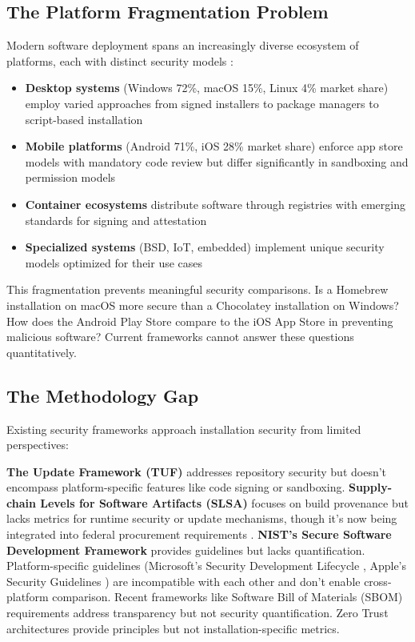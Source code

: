 \documentclass[11pt,a4paper]{article}
\begin{document}
\subsection{The Platform Fragmentation Problem}

Modern software deployment spans an increasingly diverse ecosystem of platforms, each with distinct security models \cite{anderson2024linux,liu2024ios,chen2023android}:

\begin{itemize}
    \item \textbf{Desktop systems} (Windows 72\%, macOS 15\%, Linux 4\% market share) employ varied approaches from signed installers to package managers to script-based installation \cite{microsoft2024windows,apple2023security}
    \item \textbf{Mobile platforms} (Android 71\%, iOS 28\% market share) enforce app store models with mandatory code review but differ significantly in sandboxing and permission models \cite{google2024android}
    \item \textbf{Container ecosystems} distribute software through registries with emerging standards for signing and attestation \cite{kubernetes2024security,docker2024supply}
    \item \textbf{Specialized systems} (BSD, IoT, embedded) implement unique security models optimized for their use cases \cite{kumar2024iot,sadeghi2024embedded}
\end{itemize}

This fragmentation prevents meaningful security comparisons. Is a Homebrew installation on macOS more secure than a Chocolatey installation on Windows? How does the Android Play Store compare to the iOS App Store in preventing malicious software? Current frameworks cannot answer these questions quantitatively.

\subsection{The Methodology Gap}

Existing security frameworks approach installation security from limited perspectives:

\textbf{The Update Framework (TUF)} \cite{kuppusamy2016tuf} addresses repository security but doesn't encompass platform-specific features like code signing or sandboxing. \textbf{Supply-chain Levels for Software Artifacts (SLSA)} \cite{google2021slsa} focuses on build provenance but lacks metrics for runtime security or update mechanisms, though it's now being integrated into federal procurement requirements \cite{cisa2024sbom}. \textbf{NIST's Secure Software Development Framework} \cite{nist2024ssdf} provides guidelines but lacks quantification. Platform-specific guidelines (Microsoft's Security Development Lifecycle \cite{microsoft2024windows}, Apple's Security Guidelines \cite{apple2023security}) are incompatible with each other and don't enable cross-platform comparison. Recent frameworks like Software Bill of Materials (SBOM) requirements \cite{cisa2024sbom} address transparency but not security quantification. Zero Trust architectures \cite{nist2024zerotrust,rose2024zerotrust} provide principles but not installation-specific metrics.
\end{document}
